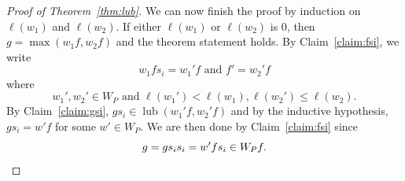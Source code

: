 \documentclass[10pt,a4paper]{amsart}
\newcommand{\lub}{\operatorname{lub}}
\begin{document}
\begin{proof}[Proof of Theorem~\ref{thm:lub}]
    
    
    We can now finish the proof by induction on $\ell(w_1)$ and $\ell(w_2)$. If either $\ell(w_1)$ or $\ell(w_2)$ is $0$, then $g = \max(w_1f,w_2f)$ and the theorem statement holds. By Claim~\ref{claim:fsi}, we write $$w_1fs_i = w_1'f\text{ and }f' = w_2'f$$
    where 
    $$w_1',w_2'\in W_P\text{ and }\ell(w_1')<\ell(w_1),\ell(w_2')\leq \ell(w_2).$$ 
    By Claim~\ref{claim:gsi}, $gs_i\in \lub(w_1'f,w_2'f)$ and by the inductive hypothesis, 
    $gs_i = w'f$ for some $w'\in W_P$. We are then done by Claim~\ref{claim:fsi} since
    \[
g = gs_is_i = w'fs_i \in W_Pf.\qedhere
    \]
\end{proof}
\end{document}
